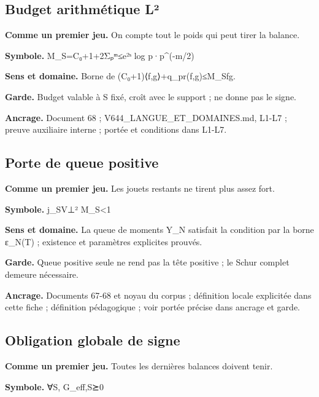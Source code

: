 \documentclass[
  9pt,
  a4paper,
]{article}
\begin{document}
\hypertarget{budget-arithmuxe9tique-luxb2}{%
\subsection{Budget arithmétique L²}\label{budget-arithmuxe9tique-luxb2}}

\textbf{Comme un premier jeu.} On compte tout le poids qui peut tirer la
balance.

\textbf{Symbole.} M\_S=C₀+1+2Σₚᵐ≤e²ˢ log p·p\^{}(-m/2)

\textbf{Sens et domaine.} Borne de
\textbar(C₀+1)⟨f,g⟩+q\_pr(f,g)\textbar≤M\_S\textbar\textbar f\textbar\textbar\textbar\textbar g\textbar\textbar.

\textbf{Garde.} Budget valable à S fixé, croît avec le support ; ne
donne pas le signe.

\textbf{Ancrage.} Document 68 ; V644\_LANGUE\_ET\_DOMAINES.md, L1-L7 ;
preuve auxiliaire interne ; portée et conditions dans L1-L7.

\hypertarget{porte-de-queue-positive}{%
\subsection{Porte de queue positive}\label{porte-de-queue-positive}}

\textbf{Comme un premier jeu.} Les jouets restants ne tirent plus assez
fort.

\textbf{Symbole.} \textbar\textbar j\_S\textbar V⊥\textbar\textbar²
M\_S\textless1

\textbf{Sens et domaine.} La queue de moments Y\_N satisfait la
condition par la borne ε\_N(T) ; existence et paramètres explicites
prouvés.

\textbf{Garde.} Queue positive seule ne rend pas la tête positive ; le
Schur complet demeure nécessaire.

\textbf{Ancrage.} Documents 67-68 et noyau du corpus ; définition locale
explicitée dans cette fiche ; définition pédagogique ; voir portée
précise dans ancrage et garde.

\hypertarget{obligation-globale-de-signe}{%
\subsection{Obligation globale de
signe}\label{obligation-globale-de-signe}}

\textbf{Comme un premier jeu.} Toutes les dernières balances doivent
tenir.

\textbf{Symbole.} ∀S, G\_eff,S⪰0
\end{document}
